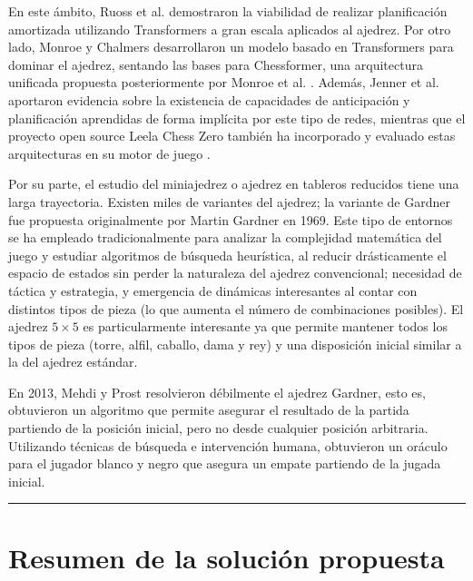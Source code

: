 \documentclass[12pt, a4paper]{article}
\let\cite\supercite
\begin{document}
En este ámbito, Ruoss et al. \cite{ruoss2024amortizedplanninglargescaletransformers} demostraron la viabilidad de realizar planificación amortizada utilizando Transformers a gran escala aplicados al ajedrez. Por otro lado, Monroe y Chalmers \cite{monroe2024masteringchesstransformermodel} desarrollaron un modelo basado en Transformers para dominar el ajedrez, sentando las bases para Chessformer, una arquitectura unificada propuesta posteriormente por Monroe et al. \cite{monroe2026chessformerunifiedarchitecturechess}. Además, Jenner et al. \cite{jenner2024evidencelearnedlookaheadchessplaying} aportaron evidencia sobre la existencia de capacidades de anticipación y planificación aprendidas de forma implícita por este tipo de redes, mientras que el proyecto open source Leela Chess Zero también ha incorporado y evaluado estas arquitecturas en su motor de juego \cite{lczero2024transformerprogress}.

Por su parte, el estudio del miniajedrez o ajedrez en tableros reducidos tiene una larga trayectoria. Existen miles de variantes del ajedrez; la variante de Gardner fue propuesta originalmente por Martin Gardner en 1969\cite{beasley2007encyclopedia}. Este tipo de entornos se ha empleado tradicionalmente para analizar la complejidad matemática del juego y estudiar algoritmos de búsqueda heurística, al reducir drásticamente el espacio de estados sin perder la naturaleza del ajedrez convencional; necesidad de táctica y estrategia, y emergencia de dinámicas interesantes al contar con distintos tipos de pieza (lo que aumenta el número de combinaciones posibles). El ajedrez $5\times5$ es particularmente interesante ya que permite mantener todos los tipos de pieza (torre, alfil, caballo, dama y rey) y una disposición inicial similar a la del ajedrez estándar. 

En 2013, Mehdi y Prost resolvieron débilmente el ajedrez Gardner, esto es, obtuvieron un algoritmo que permite asegurar el resultado de la partida partiendo de la posición inicial, pero no desde cualquier posición arbitraria. Utilizando técnicas de búsqueda e intervención humana, obtuvieron un oráculo para el jugador blanco y negro que asegura un empate partiendo de la jugada inicial. \cite{DBLP:journals/corr/MhallaP13}   

\rule{\textwidth}{0.2pt}
\section{Resumen de la solución propuesta}\label{sec:resumen}
\end{document}
